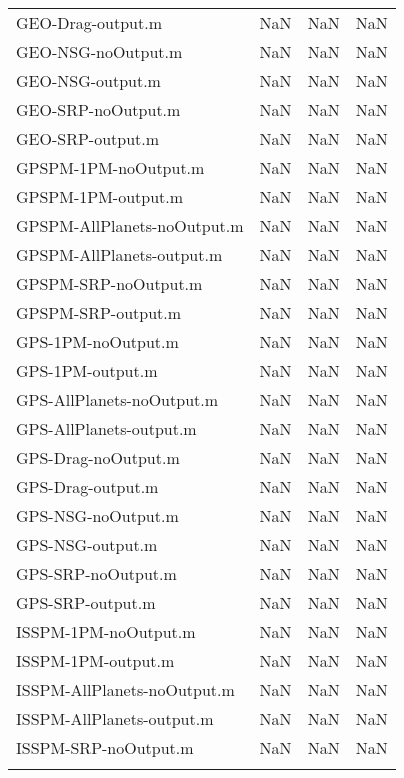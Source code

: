 \begin{table}[htbp!]
\begin{tabular}{lccc}
         GEO-Drag-output.m & NaN & NaN & NaN \\
         GEO-NSG-noOutput.m & NaN & NaN & NaN \\
         GEO-NSG-output.m & NaN & NaN & NaN \\
         GEO-SRP-noOutput.m & NaN & NaN & NaN \\
         GEO-SRP-output.m & NaN & NaN & NaN \\
         GPSPM-1PM-noOutput.m & NaN & NaN & NaN \\
         GPSPM-1PM-output.m & NaN & NaN & NaN \\
         GPSPM-AllPlanets-noOutput.m & NaN & NaN & NaN \\
         GPSPM-AllPlanets-output.m & NaN & NaN & NaN \\
         GPSPM-SRP-noOutput.m & NaN & NaN & NaN \\
         GPSPM-SRP-output.m & NaN & NaN & NaN \\
         GPS-1PM-noOutput.m & NaN & NaN & NaN \\
         GPS-1PM-output.m & NaN & NaN & NaN \\
         GPS-AllPlanets-noOutput.m & NaN & NaN & NaN \\
         GPS-AllPlanets-output.m & NaN & NaN & NaN \\
         GPS-Drag-noOutput.m & NaN & NaN & NaN \\
         GPS-Drag-output.m & NaN & NaN & NaN \\
         GPS-NSG-noOutput.m & NaN & NaN & NaN \\
         GPS-NSG-output.m & NaN & NaN & NaN \\
         GPS-SRP-noOutput.m & NaN & NaN & NaN \\
         GPS-SRP-output.m & NaN & NaN & NaN \\
         ISSPM-1PM-noOutput.m & NaN & NaN & NaN \\
         ISSPM-1PM-output.m & NaN & NaN & NaN \\
         ISSPM-AllPlanets-noOutput.m & NaN & NaN & NaN \\
         ISSPM-AllPlanets-output.m & NaN & NaN & NaN \\
         ISSPM-SRP-noOutput.m & NaN & NaN & NaN \\
      \hline\hline
      \label{Table: Performance4-1} 
\end{tabular}
\end{table}
